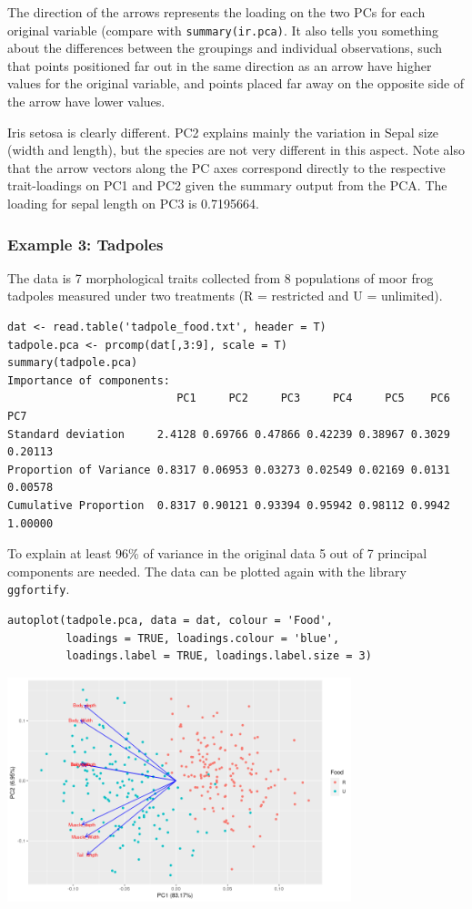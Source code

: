 \documentclass{article}
\begin{document}
The direction of the arrows represents the loading on the two PCs for each original variable (compare with \texttt{summary(ir.pca)}. It also tells you something about the differences between the groupings and individual observations, such that points positioned far out in the same direction as an arrow have higher values for the original variable, and points placed far away on the opposite side of the arrow have lower values.\par 
Iris setosa is clearly different. PC2 explains mainly the variation in Sepal size (width and length), but the species are not very different in this aspect. Note also that the arrow vectors along the PC axes correspond directly to the respective trait-loadings on PC1 and PC2 given the summary output from the PCA. The loading for sepal length on PC3 is 0.7195664.

\subsubsection{Example 3: Tadpoles}
The data is 7 morphological traits collected from 8 populations of moor frog tadpoles measured under two treatments (R = restricted and U = unlimited).

\begin{lstlisting}
dat <- read.table('tadpole_food.txt', header = T)
tadpole.pca <- prcomp(dat[,3:9], scale = T)
summary(tadpole.pca)
Importance of components:
                          PC1     PC2     PC3     PC4     PC5    PC6     PC7
Standard deviation     2.4128 0.69766 0.47866 0.42239 0.38967 0.3029 0.20113
Proportion of Variance 0.8317 0.06953 0.03273 0.02549 0.02169 0.0131 0.00578
Cumulative Proportion  0.8317 0.90121 0.93394 0.95942 0.98112 0.9942 1.00000
\end{lstlisting}

To explain at least 96\% of variance in the original data 5 out of 7 principal components are needed. The data can be plotted again with the library \texttt{ggfortify}.



\begin{lstlisting}
autoplot(tadpole.pca, data = dat, colour = 'Food',
         loadings = TRUE, loadings.colour = 'blue',
         loadings.label = TRUE, loadings.label.size = 3)
\end{lstlisting}

\begin{center}
    \includegraphics[width = 0.75\textwidth]{lab4/tadpole-pca.png}
\end{center}
\end{document}

